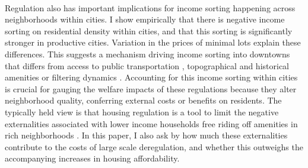 \documentclass[12pt]{article}
\begin{document}
	\paragraph*{} 
	Regulation also has important implications for income sorting happening across neighborhoods within cities. I show empirically that there is negative income sorting on residential density within cities, and that this sorting is significantly stronger in productive cities. Variation in the prices of minimal lots explain these differences. This suggests a mechanism driving income sorting into downtowns that differs from access to public transportation \citep{ccpoortransport}, topographical and historical amenities \citep{parispoor} or filtering dynamics \citep{Gentrificationcycles}. Accounting for this income sorting within cities is crucial for gauging the welfare impacts of these regulations because they alter neighborhood quality, conferring external costs or benefits on residents. The typically held view is that housing regulation is a tool to limit the negative externalities associated with lower income households free riding off amenities in rich neighborhoods \citep{calabresetal, Hamilton1975}. In this paper, I also ask by how much these externalities contribute to the costs of large scale deregulation, and whether this outweighs the accompanying increases in housing affordability.  
		
\end{document}
